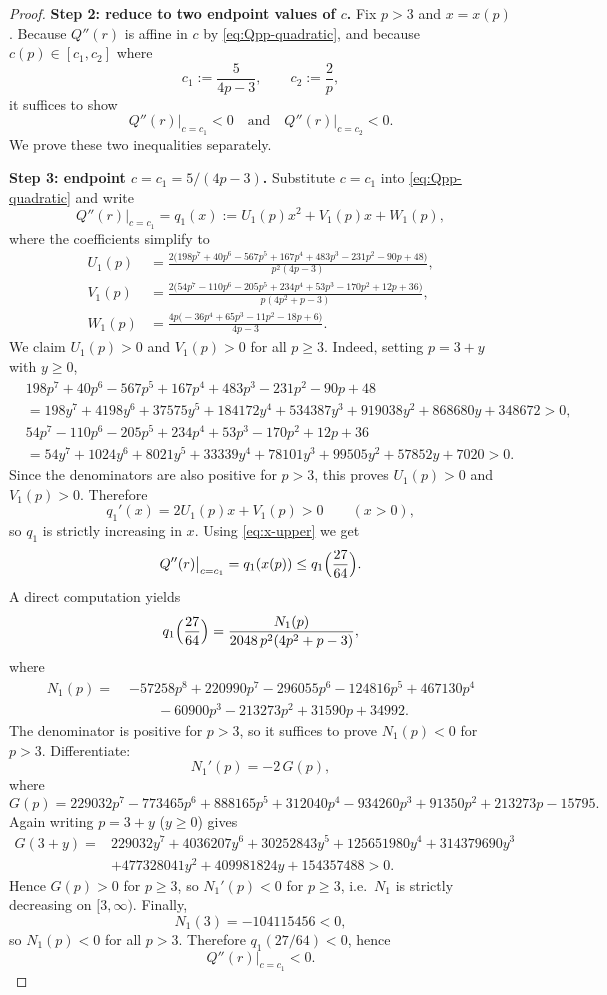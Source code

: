 \documentclass[11pt]{article}
\theoremstyle{definition}
\newcommand{\1}{\mathbf{1}}
\begin{document}
\begin{proof}
\noindent\textbf{Step 2: reduce to two endpoint values of $c$.}
Fix $p>3$ and $x=x(p)$.
Because $Q''(r)$ is affine in $c$ by \eqref{eq:Qpp-quadratic},
and because $c(p)\in[c_{1},c_{2}]$ where
\[
c_{1}:=\frac{5}{4p-3},
\qquad
c_{2}:=\frac{2}{p},
\]
it suffices to show
\[
Q''(r)\big|_{c=c_{1}}<0
\quad\text{and}\quad
Q''(r)\big|_{c=c_{2}}<0.
\]
We prove these two inequalities separately.

\medskip
\noindent\textbf{Step 3: endpoint $c=c_{1}=5/(4p-3)$.}
Substitute $c=c_{1}$ into \eqref{eq:Qpp-quadratic} and write
\[
Q''(r)\big|_{c=c_{1}}=q_{1}(x):=U_{1}(p)x^{2}+V_{1}(p)x+W_{1}(p),
\]
where the coefficients simplify to
\begin{align*}
U_{1}(p)
&=
\frac{2\bigl(198p^{7}+40p^{6}-567p^{5}+167p^{4}+483p^{3}-231p^{2}-90p+48\bigr)}
{p^{2}(4p-3)},\\[0.2em]
V_{1}(p)
&=
\frac{2\bigl(54p^{7}-110p^{6}-205p^{5}+234p^{4}+53p^{3}-170p^{2}+12p+36\bigr)}
{p(4p^{2}+p-3)},\\[0.2em]
W_{1}(p)
&=
\frac{4p\bigl(-36p^{4}+65p^{3}-11p^{2}-18p+6\bigr)}{4p-3}.
\end{align*}
We claim $U_{1}(p)>0$ and $V_{1}(p)>0$ for all $p\ge 3$.
Indeed, setting $p=3+y$ with $y\ge 0$,
\begin{align*}
&198p^{7}+40p^{6}-567p^{5}+167p^{4}+483p^{3}-231p^{2}-90p+48
\\&=198y^{7}+4198y^{6}+37575y^{5}+184172y^{4}+534387y^{3}+919038y^{2}+868680y+348672>0,\\
&54p^{7}-110p^{6}-205p^{5}+234p^{4}+53p^{3}-170p^{2}+12p+36\\
&=54y^{7}+1024y^{6}+8021y^{5}+33339y^{4}
+78101y^{3}+99505y^{2}+57852y+7020>0.
\end{align*}
Since the denominators are also positive for $p>3$, this proves $U_{1}(p)>0$ and $V_{1}(p)>0$.
Therefore
\[
q_{1}'(x)=2U_{1}(p)x+V_{1}(p)>0\qquad(x>0),
\]
so $q_{1}$ is strictly increasing in $x$.
Using \eqref{eq:x-upper} we get
\[
Q''(r)\big|_{c=c_{1}}=q_{1}(x(p))\le q_{1}\Bigl(\frac{27}{64}\Bigr).
\]
A direct computation yields
\[
q_{1}\Bigl(\frac{27}{64}\Bigr)
=
\frac{N_{1}(p)}{2048\,p^{2}(4p^{2}+p-3)},
\]
where
\begin{align*}
N_{1}(p)=\;&-57258p^{8}+220990p^{7}-296055p^{6}-124816p^{5}+467130p^{4}\\
&\qquad-60900p^{3}-213273p^{2}+31590p+34992.
\end{align*}
The denominator is positive for $p>3$, so it suffices to prove $N_{1}(p)<0$ for $p>3$.
Differentiate:
\[
N_{1}'(p)=-2\,G(p),
\]
where
\[
G(p)=229032p^{7}-773465p^{6}+888165p^{5}+312040p^{4}-934260p^{3}
+91350p^{2}+213273p-15795.
\]
Again writing $p=3+y$ ($y\ge 0$) gives
\begin{align*}
G(3+y)=&229032y^{7}+4036207y^{6}+30252843y^{5}+125651980y^{4}
+314379690y^{3}\\
&+477328041y^{2}+409981824y+154357488>0.
\end{align*}
Hence $G(p)>0$ for $p\ge 3$, so $N_{1}'(p)<0$ for $p\ge 3$, i.e.\ $N_{1}$ is strictly decreasing on $[3,\infty)$.
Finally,
\[
N_{1}(3)=-104115456<0,
\]
so $N_{1}(p)<0$ for all $p>3$. Therefore $q_{1}(27/64)<0$, hence
\[
Q''(r)\big|_{c=c_{1}}<0.
\]


\end{proof}
\end{document}

